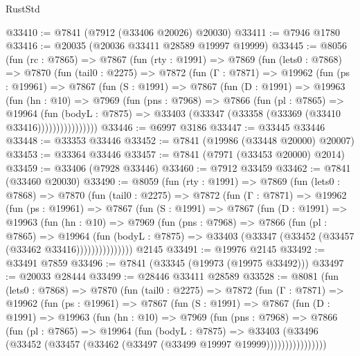 \begin{lexlean}{RustStd}
\begin{coremodule}
@33410 := @7841 (@7912 (@33406 @20026) @20030)
@33411 := @7946 @1780
@33416 := @20035 (@20036 @33411 @28589 @19997 @19999)
@33445 := @8056
    (fun (rc : @7865) =>
    @7867
      (fun (rty : @1991) =>
      @7869
        (fun (lets0 : @7868) =>
        @7870
          (fun (tail0 : @2275) =>
          @7872
            (fun (Γ : @7871) =>
            @19962
              (fun (ps : @19961) =>
              @7867
                (fun (S : @1991) =>
                @7867
                  (fun (D : @1991) =>
                  @19963
                    (fun (hn : @10) =>
                    @7969
                      (fun (pns : @7968) =>
                      @7866
                        (fun (pl : @7865) =>
                        @19964
                          (fun (bodyL : @7875) =>
                          @33403 (@33347 (@33358 (@33369 (@33410 @33416))))))))))))))))
@33446 := @6997 @3186
@33447 := @33445 @33446
@33448 := @33353 @33446
@33452 := @7841 (@19986 (@33448 @20000) @20007)
@33453 := @33364 @33446
@33457 := @7841 (@7971 (@33453 @20000) @2014)
@33459 := @33406 (@7928 @33446)
@33460 := @7912 @33459
@33462 := @7841 (@33460 @20030)
@33490 := @8059
    (fun (rty : @1991) =>
    @7869
      (fun (lets0 : @7868) =>
      @7870
        (fun (tail0 : @2275) =>
        @7872
          (fun (Γ : @7871) =>
          @19962
            (fun (ps : @19961) =>
            @7867
              (fun (S : @1991) =>
              @7867
                (fun (D : @1991) =>
                @19963
                  (fun (hn : @10) =>
                  @7969
                    (fun (pns : @7968) =>
                    @7866
                      (fun (pl : @7865) =>
                      @19964
                        (fun (bodyL : @7875) =>
                        @33403 (@33347 (@33452 (@33457 (@33462 @33416)))))))))))))))
    @2145
@33491 := @19976 @2145
@33492 := @33491 @7859
@33496 := @7841 (@33345 (@19973 (@19975 @33492)))
@33497 := @20033 @28444
@33499 := @28446 @33411 @28589
@33528 := @8081
    (fun (lets0 : @7868) =>
    @7870
      (fun (tail0 : @2275) =>
      @7872
        (fun (Γ : @7871) =>
        @19962
          (fun (ps : @19961) =>
          @7867
            (fun (S : @1991) =>
            @7867
              (fun (D : @1991) =>
              @19963
                (fun (hn : @10) =>
                @7969
                  (fun (pns : @7968) =>
                  @7866
                    (fun (pl : @7865) =>
                    @19964
                      (fun (bodyL : @7875) =>
                      @33403
                        (@33496
                          (@33452 (@33457 (@33462 (@33497 (@33499 @19997 @19999))))))))))))))))

\end{coremodule}
\end{lexlean}
